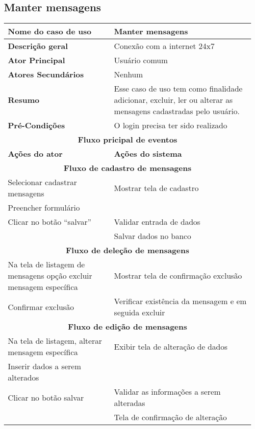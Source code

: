 \subsection{Manter mensagens}
\begin{center}
\begin{tabular}{ |p{7cm}|p{7cm}| } 
 \hline
 \textbf {Nome do caso de uso} & Manter mensagens \\
 \hline
 \textbf{Descrição geral} & Conexão com a internet 24x7 \\
 \hline
 \textbf{Ator Principal} & Usuário comum \\ 
 \hline
 \textbf{Atores Secundários} & Nenhum \\
 \hline
 \textbf{Resumo} & Esse caso de uso tem como finalidade adicionar, excluir, ler ou alterar as mensagens cadastradas pelo usuário. \\
 \hline
 \textbf{Pré-Condições} & O login precisa ter sido realizado\\
 \hline 
 \multicolumn{2}{|c|}{\textbf{Fluxo pricipal de eventos} } \\
 \hline
 \textbf{Ações do ator} & \textbf{Ações do sistema} \\
 \hline
 \multicolumn{2}{|c|}{\textbf{Fluxo de cadastro de mensagens} } \\
 \hline 
 Selecionar cadastrar mensagens & Mostrar tela de cadastro \\
 \hline
 Preencher formulário & \\
 \hline
 Clicar no botão “salvar” & Validar entrada de dados \\
 \hline
  & Salvar dados no banco \\
 \hline
 \multicolumn{2}{|c|}{\textbf{Fluxo de deleção de mensagens} } \\
 \hline 
 Na tela de listagem de mensagens opção excluir mensagem específica & Mostrar tela de confirmação exclusão \\
 \hline
 Confirmar exclusão & Verificar existência da mensagem e em seguida excluir \\
 \hline
 \multicolumn{2}{|c|}{\textbf{Fluxo de edição de mensagens} } \\
 \hline 
 Na tela de listagem, alterar mensagem específica & Exibir tela de alteração de dados \\
 \hline
 Inserir dados a serem alterados & \\
 \hline
 Clicar no botão salvar & Validar as informações a serem alteradas\\
 \hline
  & Tela de confirmação de alteração \\

\end{tabular}
\end{center}
